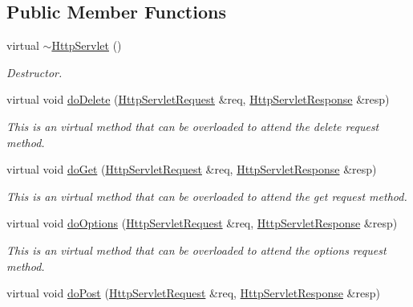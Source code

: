 \subsection*{Public Member Functions}
\begin{DoxyCompactItemize}
\item 
virtual \hyperlink{class_c_w_f_1_1_http_servlet_a62a6b834356c237ad9787d838d0b8776}{$\sim$\+Http\+Servlet} ()
\begin{DoxyCompactList}\small\item\em Destructor. \end{DoxyCompactList}\item 
virtual void \hyperlink{class_c_w_f_1_1_http_servlet_a10f9bd01fac297a92c39e4eb3ca652fe}{do\+Delete} (\hyperlink{class_c_w_f_1_1_http_servlet_request}{Http\+Servlet\+Request} \&req, \hyperlink{class_c_w_f_1_1_http_servlet_response}{Http\+Servlet\+Response} \&resp)
\begin{DoxyCompactList}\small\item\em This is an virtual method that can be overloaded to attend the delete request method. \end{DoxyCompactList}\item 
virtual void \hyperlink{class_c_w_f_1_1_http_servlet_ad05501d3611f28b20d2c045515119f20}{do\+Get} (\hyperlink{class_c_w_f_1_1_http_servlet_request}{Http\+Servlet\+Request} \&req, \hyperlink{class_c_w_f_1_1_http_servlet_response}{Http\+Servlet\+Response} \&resp)
\begin{DoxyCompactList}\small\item\em This is an virtual method that can be overloaded to attend the get request method. \end{DoxyCompactList}\item 
virtual void \hyperlink{class_c_w_f_1_1_http_servlet_afa172deaf51e527c474ccdd093075e91}{do\+Options} (\hyperlink{class_c_w_f_1_1_http_servlet_request}{Http\+Servlet\+Request} \&req, \hyperlink{class_c_w_f_1_1_http_servlet_response}{Http\+Servlet\+Response} \&resp)
\begin{DoxyCompactList}\small\item\em This is an virtual method that can be overloaded to attend the options request method. \end{DoxyCompactList}\item 
virtual void \hyperlink{class_c_w_f_1_1_http_servlet_a65ddc8bb71865d748c1b1b3303e593b3}{do\+Post} (\hyperlink{class_c_w_f_1_1_http_servlet_request}{Http\+Servlet\+Request} \&req, \hyperlink{class_c_w_f_1_1_http_servlet_response}{Http\+Servlet\+Response} \&resp)

\end{DoxyCompactItemize}
